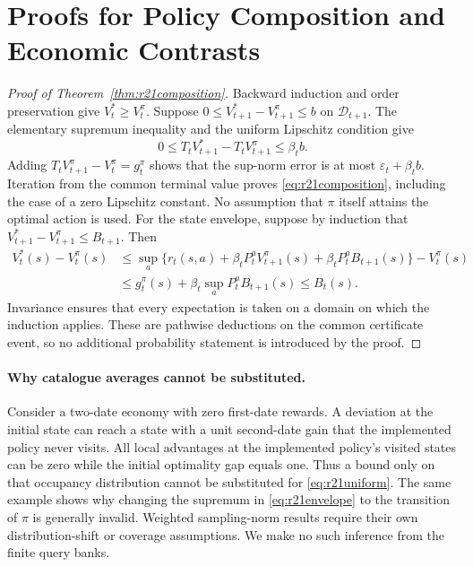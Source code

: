 \documentclass[ecta,nameyear,draft]{econsocart}
\theoremstyle{definition}
\theoremstyle{remark}
\begin{document}
\section{Proofs for Policy Composition and Economic Contrasts}\label{app:r21proofs}
\begin{proof}[Proof of Theorem~\ref{thm:r21composition}]
Backward induction and order preservation give $V_t^*\geq V_t^\pi$.
Suppose $0\leq V_{t+1}^*-V_{t+1}^\pi\leq b$ on $\mathcal D_{t+1}$.
The elementary supremum inequality and the uniform Lipschitz condition give
\[
 0\leq T_tV_{t+1}^*-T_tV_{t+1}^\pi\leq\beta_tb.
\]
Adding $T_tV_{t+1}^\pi-V_t^\pi=g_t^\pi$ shows that the sup-norm error is at
most $\varepsilon_t+\beta_tb$. Iteration from the common terminal value
proves \eqref{eq:r21composition}, including the case of a zero Lipschitz
constant. No assumption that $\pi$ itself attains the optimal action is used.
For the state envelope, suppose by induction that
$V_{t+1}^*-V_{t+1}^\pi\leq B_{t+1}$. Then
\begin{align*}
 V_t^*(s)-V_t^\pi(s)
 &\leq \sup_a\{r_t(s,a)+\beta_tP_t^aV_{t+1}^\pi(s)
                  +\beta_tP_t^aB_{t+1}(s)\}-V_t^\pi(s)\\
 &\leq g_t^\pi(s)+\beta_t\sup_aP_t^aB_{t+1}(s)
 \leq B_t(s).
\end{align*}
Invariance ensures that every expectation is taken on a domain on which the
induction applies. These are pathwise deductions on the common certificate
event, so no additional probability statement is introduced by the proof.
\end{proof}

\paragraph{Why catalogue averages cannot be substituted.}
Consider a two-date economy with zero first-date rewards. A deviation at the
initial state can reach a state with a unit second-date gain that the
implemented policy never visits. All local advantages at the implemented
policy's visited states can be zero while the initial optimality gap equals
one. Thus a bound only on that occupancy distribution cannot be substituted
for \eqref{eq:r21uniform}. The same example shows why changing the supremum
in \eqref{eq:r21envelope} to the transition of $\pi$ is generally invalid.
Weighted sampling-norm results require their own distribution-shift or
coverage assumptions. We make no such inference from the finite query banks.
\end{document}
